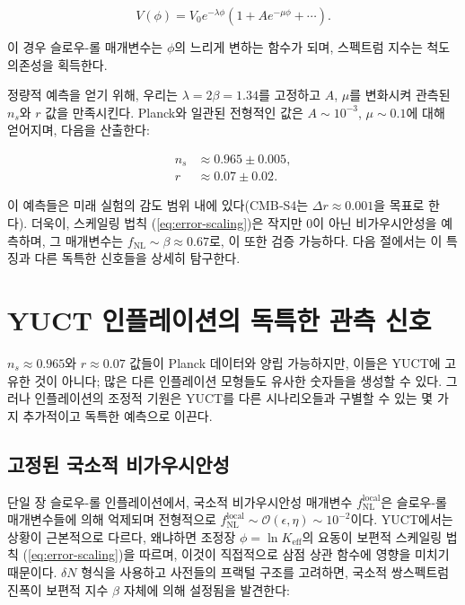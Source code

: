 \documentclass[11pt,a4paper]{article}
\newcommand{\Keff}{K_{\mathrm{eff}}}
\newcommand{\rs}{r}
\begin{document}
	\begin{equation}
		V(\phi) = V_0 e^{-\lambda \phi} \left(1 + A e^{-\mu \phi} + \cdots \right).
	\end{equation}
	
	이 경우 슬로우-롤 매개변수는 \(\phi\)의 느리게 변하는 함수가 되며, 스펙트럼 지수는 척도 의존성을 획득한다.
	
	정량적 예측을 얻기 위해, 우리는 \(\lambda = 2\beta = 1.34\)를 고정하고 \(A\), \(\mu\)를 변화시켜 관측된 \(n_s\)와 \(\rs\) 값을 만족시킨다. Planck와 일관된 전형적인 값은 \(A \sim 10^{-3}\), \(\mu \sim 0.1\)에 대해 얻어지며, 다음을 산출한다:
	
	\begin{align}
		n_s &\approx 0.965 \pm 0.005, \\
		\rs &\approx 0.07 \pm 0.02.
	\end{align}
	
	이 예측들은 미래 실험의 감도 범위 내에 있다(CMB‑S4는 \(\Delta r \approx 0.001\)을 목표로 한다). 더욱이, 스케일링 법칙 (\ref{eq:error-scaling})은 작지만 0이 아닌 비가우시안성을 예측하며, 그 매개변수는 \(f_{\mathrm{NL}} \sim \beta \approx 0.67\)로, 이 또한 검증 가능하다. 다음 절에서는 이 특징과 다른 독특한 신호들을 상세히 탐구한다.
	
	\section{YUCT 인플레이션의 독특한 관측 신호}
	\label{sec:signatures}
	
	\(n_s \approx 0.965\)와 \(r \approx 0.07\) 값들이 Planck 데이터와 양립 가능하지만, 이들은 YUCT에 고유한 것이 아니다; 많은 다른 인플레이션 모형들도 유사한 숫자들을 생성할 수 있다. 그러나 인플레이션의 조정적 기원은 YUCT를 다른 시나리오들과 구별할 수 있는 몇 가지 추가적이고 독특한 예측으로 이끈다.
	
	\subsection{고정된 국소적 비가우시안성}
	
	단일 장 슬로우-롤 인플레이션에서, 국소적 비가우시안성 매개변수 \(f_{\text{NL}}^{\text{local}}\)은 슬로우-롤 매개변수들에 의해 억제되며 전형적으로 \(f_{\text{NL}}^{\text{local}} \sim \mathcal{O}(\epsilon, \eta) \sim 10^{-2}\)이다. YUCT에서는 상황이 근본적으로 다르다, 왜냐하면 조정장 \(\phi = \ln \Keff\)의 요동이 보편적 스케일링 법칙 (\ref{eq:error-scaling})을 따르며, 이것이 직접적으로 삼점 상관 함수에 영향을 미치기 때문이다. \(\delta N\) 형식을 사용하고 사전들의 프랙털 구조를 고려하면, 국소적 쌍스펙트럼 진폭이 보편적 지수 \(\beta\) 자체에 의해 설정됨을 발견한다:
	
\end{document}
